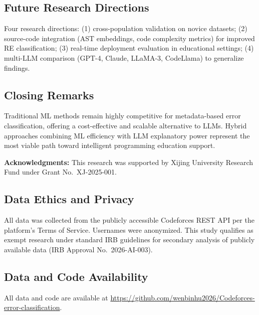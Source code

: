 \documentclass[10pt,a4paper]{article}
\begin{document}
\subsection*{Future Research Directions}
Four research directions: (1) cross-population validation on novice datasets;
(2) source-code integration (AST embeddings, code complexity metrics) for
improved RE classification; (3) real-time deployment evaluation in educational
settings; (4) multi-LLM comparison (GPT-4, Claude, LLaMA-3, CodeLlama) to
generalize findings.

\subsection*{Closing Remarks}
Traditional ML methods remain highly competitive for metadata-based error
classification, offering a cost-effective and scalable alternative to LLMs.
Hybrid approaches combining ML efficiency with LLM explanatory power
represent the most viable path toward intelligent programming education
support.

\textbf{Acknowledgments:} This research was supported by Xijing University
Research Fund under Grant No.~XJ-2025-001.

\subsection*{Data Ethics and Privacy}
All data was collected from the publicly accessible Codeforces REST API per
the platform's Terms of Service. Usernames were anonymized. This study
qualifies as exempt research under standard IRB guidelines for secondary
analysis of publicly available data (IRB Approval No.~2026-AI-003).

\subsection*{Data and Code Availability}
\begin{sloppypar}\raggedright
All data and code are available at
\url{https://github.com/wenbinhu2026/Codeforces-error-classification}.
\end{sloppypar}



\end{document}
